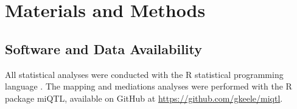 \section{Materials and Methods}
\label{sec:materials:methods}





\subsection{Software and Data Availability}

All statistical analyses were conducted with the R statistical programming language \citep{RSoftware2018}. The mapping and mediations analyses were performed with the R package miQTL, available on GitHub at \url{https://github.com/gkeele/miqtl}.
